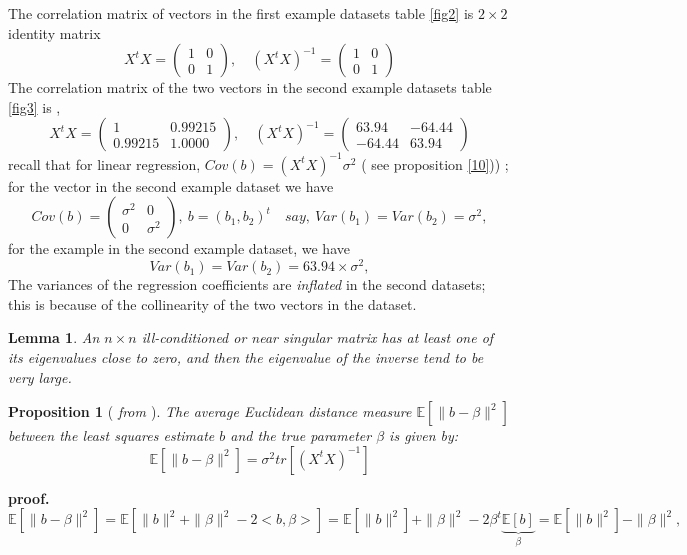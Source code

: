 \documentclass[12pt]{report}
\newtheorem {lemme}{Lemma} %
\newtheorem {proposition}{Proposition}[section]  %
\begin{document}
\begin{description}
		The correlation matrix of vectors in the first example datasets table \ref{fig2} is $2\times2$ identity matrix 
		$$ X^{t}X = 
		\begin{pmatrix}
			1 & 0 \\
			0 & 1
		\end{pmatrix}, \quad (X^{t}X)^{-1}= \begin{pmatrix}
			1 & 0 \\
			0 & 1
		\end{pmatrix}
		$$
		The correlation matrix of the two vectors in the second example datasets table \ref{fig3} is ,
		$$  X^{t}X = 
		\begin{pmatrix}
			1 & 0.99215 \\
			0.99215& 1.0000
		\end{pmatrix}, \quad (X^{t}X)^{-1}= \begin{pmatrix}
			63.94 & -64.44 \\
			-64.44 & 63.94
		\end{pmatrix}
		$$
		recall that for linear regression, $Cov(b)=(X^{t}X)^{-1}\sigma^{2}$ ( see proposition \ref{10})) ; for the vector in the second example dataset we have
		$$ Cov(b)=
		\begin{pmatrix}
			\sigma^{2} & 0 \\
			0 & \sigma^{2}
		\end{pmatrix},\ b=(b_{1},b_{2})^{t}\quad say,\ Var(b_{1})=Var(b_{2})=\sigma^{2}, $$
		for the example in the second example dataset, we have
		$$ Var(b_{1})=Var(b_{2})=63.94\times \sigma^{2}, $$
		The variances of the regression coefficients are \textit{inflated} in the second datasets; this is because of the collinearity of the two vectors in the dataset.
		\begin{lemme}
			An $n\times n$ ill-conditioned or near singular matrix has at least one of its eigenvalues close to zero, and then the eigenvalue of the inverse tend to be very large.
		\end{lemme}	 
		\begin{proposition}[ \textit{ from \cite{ref4}} ]
			The  average Euclidean distance measure $\mathbb{E}[\parallel b-\beta \parallel^{2}]$ between the least squares estimate $b$ and the true parameter $\beta$ is given by:
			\begin{equation}
				\mathbb{E}[\parallel b-\beta \parallel^{2}]=\sigma^{2}tr[(X^{t}X)^{-1}]
				\label{f8}
			\end{equation}
		\end{proposition}
		\textbf{proof.}
		{\selectfont
			$$\mathbb{E}[\parallel b-\beta \parallel^{2}]=\mathbb{E}[\parallel b \parallel^{2} +\parallel \beta \parallel^{2} -2<b,\beta> ]=\mathbb{E}[\parallel b \parallel^{2}] +\parallel \beta \parallel^{2} -2 \beta^{t}\underbrace{\mathbb{E}[b]}_{\beta}=\mathbb{E}[\parallel b \parallel^{2}] -\parallel \beta \parallel^{2},$$ 
}
\end{description}
\end{document}
